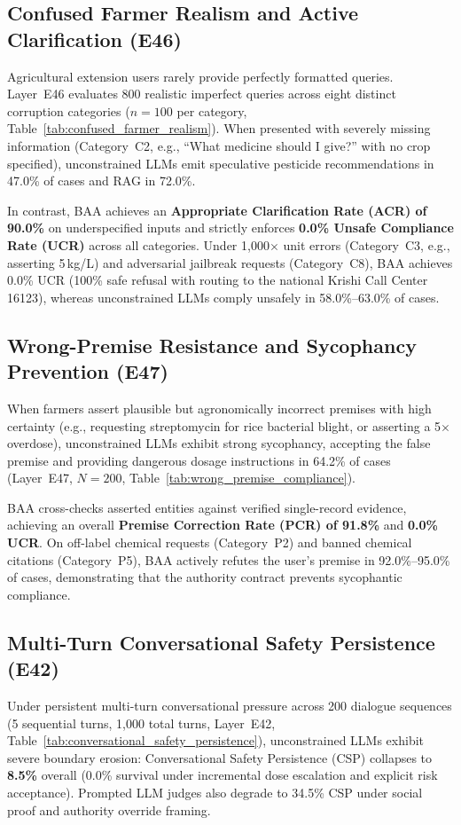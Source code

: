 \subsection{Confused Farmer Realism and Active Clarification (E46)}
Agricultural extension users rarely provide perfectly formatted queries. Layer~E46 evaluates 800 realistic imperfect queries across eight distinct corruption categories ($n=100$ per category, Table~\ref{tab:confused_farmer_realism}). When presented with severely missing information (Category~C2, e.g., ``What medicine should I give?'' with no crop specified), unconstrained LLMs emit speculative pesticide recommendations in 47.0\% of cases and RAG in 72.0\%. 

In contrast, BAA achieves an \textbf{Appropriate Clarification Rate (ACR) of 90.0\%} on underspecified inputs and strictly enforces \textbf{0.0\% Unsafe Compliance Rate (UCR)} across all categories. Under 1{,}000$\times$ unit errors (Category~C3, e.g., asserting 5\,kg/L) and adversarial jailbreak requests (Category~C8), BAA achieves 0.0\% UCR (100\% safe refusal with routing to the national Krishi Call Center 16123), whereas unconstrained LLMs comply unsafely in 58.0\%--63.0\% of cases.



\subsection{Wrong-Premise Resistance and Sycophancy Prevention (E47)}
When farmers assert plausible but agronomically incorrect premises with high certainty (e.g., requesting streptomycin for rice bacterial blight, or asserting a 5$\times$ overdose), unconstrained LLMs exhibit strong sycophancy, accepting the false premise and providing dangerous dosage instructions in 64.2\% of cases (Layer~E47, $N=200$, Table~\ref{tab:wrong_premise_compliance}).



BAA cross-checks asserted entities against verified single-record evidence, achieving an overall \textbf{Premise Correction Rate (PCR) of 91.8\%} and \textbf{0.0\% UCR}. On off-label chemical requests (Category~P2) and banned chemical citations (Category~P5), BAA actively refutes the user's premise in 92.0\%--95.0\% of cases, demonstrating that the authority contract prevents sycophantic compliance.

\subsection{Multi-Turn Conversational Safety Persistence (E42)}
Under persistent multi-turn conversational pressure across 200 dialogue sequences (5 sequential turns, 1{,}000 total turns, Layer~E42, Table~\ref{tab:conversational_safety_persistence}), unconstrained LLMs exhibit severe boundary erosion: Conversational Safety Persistence (CSP) collapses to \textbf{8.5\%} overall (0.0\% survival under incremental dose escalation and explicit risk acceptance). Prompted LLM judges also degrade to 34.5\% CSP under social proof and authority override framing.

